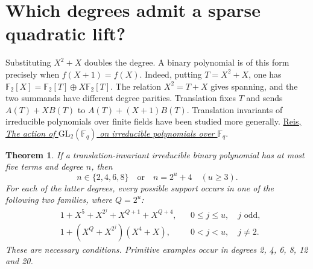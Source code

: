 \documentclass[11pt]{article}
\newtheorem{theorem}{Theorem}
\newcommand{\F}{\mathbb F_2}
\begin{document}
\section{Which degrees admit a sparse quadratic lift?}
Substituting \(X^2+X\) doubles the degree. A binary polynomial is of
this form precisely when \(f(X+1)=f(X)\). Indeed, putting \(T=X^2+X\),
one has \(\F[X]=\F[T]\oplus X\F[T]\). The relation \(X^2=T+X\)
gives spanning, and the two summands have different degree parities.
Translation fixes \(T\) and sends \(A(T)+XB(T)\) to
\(A(T)+(X+1)B(T)\). Translation invariants of irreducible
polynomials over finite fields have been studied more generally.
\href{https://arxiv.org/abs/1608.03915}{Reis, \emph{The action of
\(\mathrm{GL}_2(\mathbb F_q)\) on irreducible polynomials over \(\mathbb F_q\)}}.

\begin{theorem}\label{thm:translation}
If a translation-invariant irreducible binary polynomial has at most
five terms and degree \(n\), then
\[
       n\in\{2,4,6,8\}\quad\text{or}\quad n=2^u+4\quad(u\ge3).
\]
For each of the latter degrees, every possible support occurs in one
of the following two families, where \(Q=2^u\):
\[
\begin{aligned}
 &1+X^5+X^{2^j}+X^{Q+1}+X^{Q+4},
                    &&0\le j\le u,\quad j\text{ odd},\\
 &1+(X^Q+X^{2^j})(X^4+X),
                    &&0<j<u,\quad j\ne2.
\end{aligned}
\]
These are necessary conditions. Primitive examples occur in degrees
2, 4, 6, 8, 12 and 20.
\end{theorem}
\end{document}
